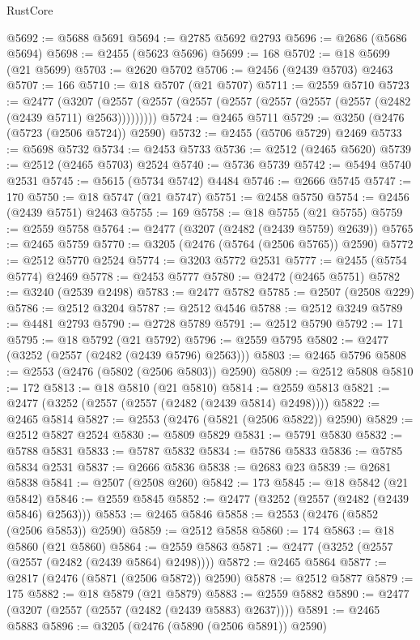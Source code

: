 \begin{lexlean}{RustCore}
\begin{coremodule}
@5692 := @5688 @5691
@5694 := @2785 @5692 @2793
@5696 := @2686 (@5686 @5694)
@5698 := @2455 (@5623 @5696)
@5699 := 168
@5702 := @18 @5699 (@21 @5699)
@5703 := @2620 @5702
@5706 := @2456 (@2439 @5703) @2463
@5707 := 166
@5710 := @18 @5707 (@21 @5707)
@5711 := @2559 @5710
@5723 := @2477
    (@3207 (@2557 (@2557 (@2557 (@2557 (@2557 (@2557 (@2557 (@2482 (@2439 @5711) @2563)))))))))
@5724 := @2465 @5711
@5729 := @3250 (@2476 (@5723 (@2506 @5724)) @2590)
@5732 := @2455 (@5706 @5729) @2469
@5733 := @5698 @5732
@5734 := @2453 @5733
@5736 := @2512 (@2465 @5620)
@5739 := @2512 (@2465 @5703) @2524
@5740 := @5736 @5739
@5742 := @5494 @5740 @2531
@5745 := @5615 (@5734 @5742) @4484
@5746 := @2666 @5745
@5747 := 170
@5750 := @18 @5747 (@21 @5747)
@5751 := @2458 @5750
@5754 := @2456 (@2439 @5751) @2463
@5755 := 169
@5758 := @18 @5755 (@21 @5755)
@5759 := @2559 @5758
@5764 := @2477 (@3207 (@2482 (@2439 @5759) @2639))
@5765 := @2465 @5759
@5770 := @3205 (@2476 (@5764 (@2506 @5765)) @2590)
@5772 := @2512 @5770 @2524
@5774 := @3203 @5772 @2531
@5777 := @2455 (@5754 @5774) @2469
@5778 := @2453 @5777
@5780 := @2472 (@2465 @5751)
@5782 := @3240 (@2539 @2498)
@5783 := @2477 @5782
@5785 := @2507 (@2508 @229)
@5786 := @2512 @3204
@5787 := @2512 @4546
@5788 := @2512 @3249
@5789 := @4481 @2793
@5790 := @2728 @5789
@5791 := @2512 @5790
@5792 := 171
@5795 := @18 @5792 (@21 @5792)
@5796 := @2559 @5795
@5802 := @2477 (@3252 (@2557 (@2482 (@2439 @5796) @2563)))
@5803 := @2465 @5796
@5808 := @2553 (@2476 (@5802 (@2506 @5803)) @2590)
@5809 := @2512 @5808
@5810 := 172
@5813 := @18 @5810 (@21 @5810)
@5814 := @2559 @5813
@5821 := @2477 (@3252 (@2557 (@2557 (@2482 (@2439 @5814) @2498))))
@5822 := @2465 @5814
@5827 := @2553 (@2476 (@5821 (@2506 @5822)) @2590)
@5829 := @2512 @5827 @2524
@5830 := @5809 @5829
@5831 := @5791 @5830
@5832 := @5788 @5831
@5833 := @5787 @5832
@5834 := @5786 @5833
@5836 := @5785 @5834 @2531
@5837 := @2666 @5836
@5838 := @2683 @23
@5839 := @2681 @5838
@5841 := @2507 (@2508 @260)
@5842 := 173
@5845 := @18 @5842 (@21 @5842)
@5846 := @2559 @5845
@5852 := @2477 (@3252 (@2557 (@2482 (@2439 @5846) @2563)))
@5853 := @2465 @5846
@5858 := @2553 (@2476 (@5852 (@2506 @5853)) @2590)
@5859 := @2512 @5858
@5860 := 174
@5863 := @18 @5860 (@21 @5860)
@5864 := @2559 @5863
@5871 := @2477 (@3252 (@2557 (@2557 (@2482 (@2439 @5864) @2498))))
@5872 := @2465 @5864
@5877 := @2817 (@2476 (@5871 (@2506 @5872)) @2590)
@5878 := @2512 @5877
@5879 := 175
@5882 := @18 @5879 (@21 @5879)
@5883 := @2559 @5882
@5890 := @2477 (@3207 (@2557 (@2557 (@2482 (@2439 @5883) @2637))))
@5891 := @2465 @5883
@5896 := @3205 (@2476 (@5890 (@2506 @5891)) @2590)

\end{coremodule}
\end{lexlean}
